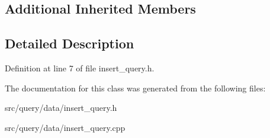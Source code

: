 \subsection*{Additional Inherited Members}


\subsection{Detailed Description}


Definition at line 7 of file insert\+\_\+query.\+h.



The documentation for this class was generated from the following files\+:\begin{DoxyCompactItemize}
\item 
src/query/data/insert\+\_\+query.\+h\item 
src/query/data/insert\+\_\+query.\+cpp\end{DoxyCompactItemize}
